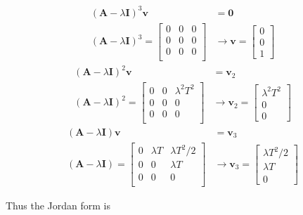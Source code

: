 \begin{align*}
 (\mathbf{A}-\lambda \mathbf{I})^3 \mathbf{v}& = \mathbf{0} \\
 (\mathbf{A}-\lambda \mathbf{I})^3 = \begin{bmatrix}
  0 & 0 & 0\\
  0 & 0 & 0\\
  0 & 0 & 0\\
 \end{bmatrix}
&\rightarrow \mathbf{v}= \begin{bmatrix}
                            0\\0\\1
                           \end{bmatrix}
\end{align*}
\begin{align*}
 (\mathbf{A}-\lambda \mathbf{I})^2 \mathbf{v}& = \mathbf{v}_2 \\
 (\mathbf{A}-\lambda \mathbf{I})^2 = \begin{bmatrix}
  0 & 0 & \lambda^2 T^2 \\
  0 & 0 & 0\\
  0 & 0 & 0\\
 \end{bmatrix}
&\rightarrow \mathbf{v}_2= \begin{bmatrix}
                            \lambda^2 T^2\\0\\0
                           \end{bmatrix}
\end{align*}
\begin{align*}
 (\mathbf{A}-\lambda \mathbf{I}) \mathbf{v}& = \mathbf{v}_3 \\
 (\mathbf{A}-\lambda \mathbf{I}) = \begin{bmatrix}
  0 & \lambda T & \lambda T^2/2\\
  0 & 0 & \lambda T\\
  0 & 0 & 0\\
 \end{bmatrix}
&\rightarrow \mathbf{v}_3= \begin{bmatrix}
                            \lambda T^2 / 2 \\ \lambda T \\ 0
                           \end{bmatrix}
\end{align*}

 Thus the Jordan form is

